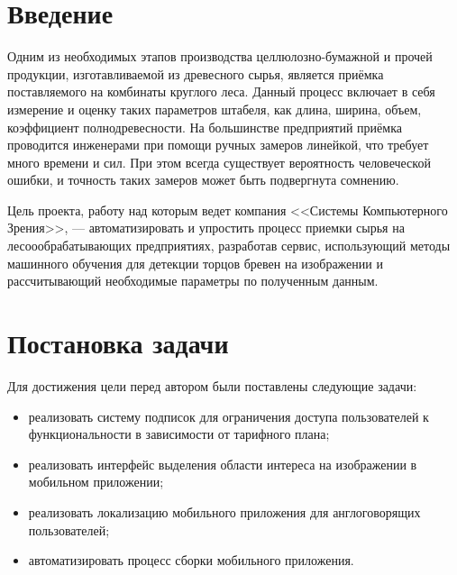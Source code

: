 \documentclass[14pt]{matmex-diploma-custom}
\begin{document}
\maketitle
\tableofcontents

\section*{Введение}

Одним из необходимых этапов производства целлюлозно-бумажной и прочей продукции, изготавливаемой из древесного сырья, является приёмка поставляемого на комбинаты круглого леса. Данный процесс включает в себя измерение и оценку таких параметров штабеля, как длина, ширина, объем, коэффициент полнодревесности. На большинстве предприятий приёмка проводится инженерами при помощи ручных замеров линейкой, что требует много времени и сил. При этом всегда существует вероятность человеческой ошибки, и точность таких замеров может быть подвергнута сомнению.

Цель проекта, работу над которым ведет компания <<Системы Компьютерного Зрения>>, --- автоматизировать и упростить процесс приемки сырья на лесоообрабатывающих предприятиях, разработав сервис, использующий методы машинного обучения для детекции торцов бревен на изображении и рассчитывающий необходимые параметры по полученным данным.


\section*{Постановка задачи}

Для достижения цели перед автором были поставлены следующие задачи:

\begin{itemize}  
\item реализовать систему подписок для ограничения доступа пользователей к функциональности в зависимости от тарифного плана;
\item реализовать интерфейс выделения области интереса на изображении в мобильном приложении;
\item реализовать локализацию мобильного приложения для англоговорящих пользователей;
\item автоматизировать процесс сборки мобильного приложения.
\end{itemize}
\end{document}
